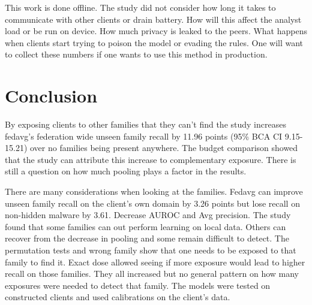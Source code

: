 \documentclass[12pt,letterpaper]{article}
\begin{document}
This work is done offline. The study did not consider how long it takes to communicate with other clients or drain battery. How will this affect the analyst load or be run on device. How much privacy is leaked to the peers. What happens when clients start trying to poison the model or evading the rules. One will want to collect these numbers if one wants to use this method in production.

\section*{Conclusion} 

By exposing clients to other families that they can't find the study increases fedavg's federation wide unseen family recall by 11.96 points (95\% BCA CI 9.15-15.21) over no families being present anywhere. The budget comparison showed that the study can attribute this increase to complementary exposure. There is still a question on how much pooling plays a factor in the results.

There are many considerations when looking at the families. Fedavg can improve unseen family recall on the client's own domain by 3.26 points but lose recall on non-hidden malware by 3.61. Decrease AUROC and Avg precision. The study found that some families can out perform learning on local data. Others can recover from the decrease in pooling and some remain difficult to detect. The permutation tests and wrong family show that one needs to be exposed to that family to find it. Exact dose allowed seeing if more exposure would lead to higher recall on those families. They all increased but no general pattern on how many exposures were needed to detect that family. The models were tested on constructed clients and used calibrations on the client's data.

\clearpage
\end{document}
